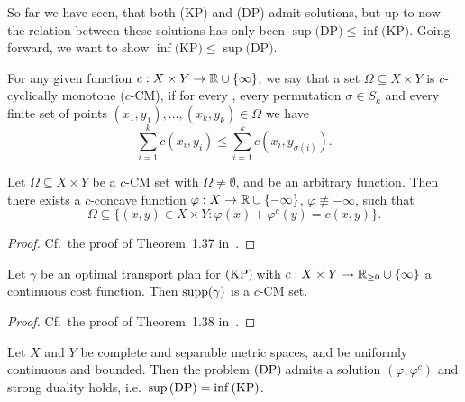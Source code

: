 So far we have seen, that both (KP) and (DP) admit solutions, but up to now the relation between these solutions has only been $\sup \text{(DP)} \le \inf \text{(KP)}$. Going forward, we want to show $\inf \text{(KP)} \le \sup \text{(DP)}$.

\begin{definition}\label{c-CM}
	For any given function $\map[c]{X \times{} Y}{\R \cup \{ \infty \}}$, we say that a set $\Omega \subseteq X \times Y$ is $c$-cyclically monotone ($c$-CM), if for every \NinN[k], every permutation $\sigma \in S_k$ and every finite set of points $(x_1, y_1), \dots, (x_k, y_k) \in \Omega$ we have
	\[ \sum\limits_{i = 1}^k c(x_i, y_i) \le \sum\limits_{i = 1}^k c(x_i, y_{\sigma(i)}). \]
\end{definition}

\begin{lemma}\label{c-CM-c-ConcExist}
	Let $\Omega \subseteq X \times Y$ be a $c$-CM set with $\Omega \neq \emptyset$, and  be an arbitrary function. Then there exists a $c$-concave function $\map[\varphi]{X}{\R \cup \{ - \infty \}}$, $\varphi \not\equiv -\infty$, such that
	\[ \Omega \subseteq \big\{ (x, y) \in X \times Y : \varphi(x) + \varphi^c(y) = c(x, y) \big\}. \]
\end{lemma}

\begin{proof}
	Cf.~the proof of Theorem~1.37 in~\cite{San2015}.
\end{proof}

\begin{lemma}\label{OTPlanc-CM}
	Let $\gamma$ be an optimal transport plan for$\text{\normalfont\ (KP)\,}$with $\map[c]{X \times Y}{\RZero \cup \{ \infty \}}$ a continuous cost function. Then $\text{\normalfont{}supp}(\gamma)$ is a $c$-CM set.
\end{lemma}

\begin{proof}
	Cf.~the proof of Theorem~1.38 in~\cite{San2015}.
\end{proof}

\begin{theorem}\label{BoundedPDRel}
	Let $X$ and $Y$ be complete and separable metric spaces, and  be uniformly continuous and bounded. Then the problem$\text{\normalfont\ (DP)\,}$admits a solution $(\varphi, \varphi^c)$ and strong duality holds, i.e.\ $\sup \!\text{\normalfont\,(DP)} = \inf \!\text{\normalfont\,(KP)}$.
\end{theorem}

